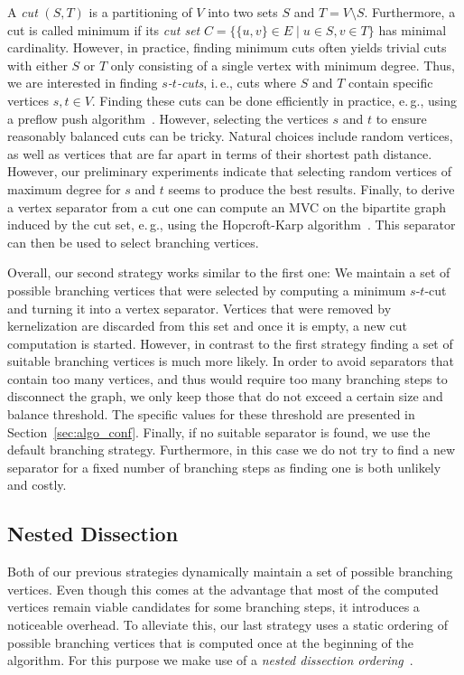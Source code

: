 \documentclass[a4paper,UKenglish,cleveref, autoref, thm-restate]{lipics-v2021}
\newcommand{\ie}{i.\,e.,\xspace}
\newcommand{\eg}{e.\,g.,\xspace}
\begin{document}
A \emph{cut} $(S,T)$ is a partitioning of $V$ into two sets $S$ and $T=V\setminus S$.
Furthermore, a cut is called minimum if its \emph{cut set} $C = \{\{u,v\} \in E \mid u \in S, v \in T\}$ has minimal cardinality.
However, in practice, finding minimum cuts often yields trivial cuts with either $S$ or $T$ only consisting of a single vertex with minimum degree. 
Thus, we are interested in finding \emph{$s$-$t$-cuts}, \ie cuts where $S$ and $T$ contain specific vertices $s,t \in V$.
Finding these cuts can be done efficiently in practice, \eg using a preflow push algorithm~\cite{goldberg1988new}.
However, selecting the vertices $s$ and $t$ to ensure reasonably balanced cuts can be tricky.
Natural choices include random vertices, as well as vertices that are far apart in terms of their shortest path distance.
However, our preliminary experiments indicate that selecting random vertices of maximum degree
 for $s$ and $t$ seems to produce the best results.
Finally, to derive a vertex separator from a cut one can compute an MVC on the bipartite graph induced by the cut set, \eg using the Hopcroft-Karp algorithm~\cite{hopcroft1973n}.
This separator can then be used to select branching vertices.

Overall, our second strategy works similar to the first one: We maintain a set of possible branching vertices that were selected by computing a minimum $s$-$t$-cut and turning it into a vertex separator.
Vertices that were removed by kernelization are discarded from this set and once it is empty, a new cut computation is started.
However, in contrast to the first strategy finding a set of suitable branching vertices is much more likely.
In order to avoid separators that contain too many vertices, and thus would require too many branching steps to disconnect the graph, we only keep those that do not exceed a certain size and balance threshold.
The specific values for these threshold are presented in Section~\ref{sec:algo_conf}.
Finally, if no suitable separator is found, we use the default branching strategy.
Furthermore, in this case we do not try to find a new separator for a fixed number of branching steps as finding one is both unlikely and costly.

\subsection{Nested Dissection}
Both of our previous strategies dynamically maintain a set of possible branching vertices.
Even though this comes at the advantage that most of the computed vertices remain viable candidates for some branching steps, it introduces a noticeable overhead.
To alleviate this, our last strategy uses a static ordering of possible branching vertices that is computed once at the beginning of the algorithm.
For this purpose we make use of a \emph{nested dissection ordering}~\cite{george1973nested}.
\end{document}
